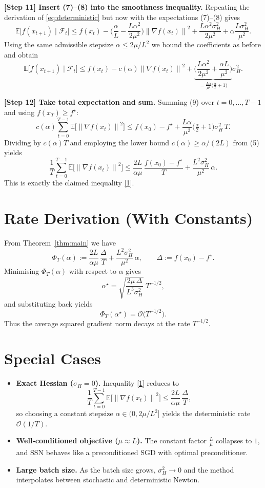 \documentclass{article}
\newcommand{\E}{\mathbb{E}}
\newcommand{\norm}[1]{\left\|#1\right\|}
\begin{document}
\noindent\textbf{[Step 11] Insert (7)–(8) into the smoothness inequality.}
Repeating the derivation of \eqref{eq:deterministic} but now with the
expectations (7)–(8) gives
\[
\E\!\big[f(x_{t+1})\mid\mathcal{F}_t\big]
\le f(x_t)-\Big(\frac{\alpha}{L}
               -\frac{L\alpha^2}{2\mu^2}\Big)\norm{\nabla f(x_t)}^2
      +\frac{L\alpha^2\sigma_H^2}{2\mu^2}
      +\alpha\frac{L\sigma_H^2}{\mu^2}.
\]
Using the same admissible stepsize $\alpha\le 2\mu/L^2$ we bound the
coefficients as before and obtain
\[
\E\!\big[f(x_{t+1})\mid\mathcal{F}_t\big]
\le f(x_t)-c(\alpha)\norm{\nabla f(x_t)}^2
      +\underbrace{\Big(\frac{L\alpha^2}{2\mu^2}
                     +\frac{\alpha L}{\mu^2}\Big)}_{\displaystyle
                     =\frac{L\alpha}{\mu^2}\big(\tfrac{\alpha}{2}+1\big)}
        \sigma_H^2 .
\tag{9}
\]

\noindent\textbf{[Step 12] Take total expectation and sum.}
Summing (9) over $t=0,\dots,T-1$ and using $f(x_T)\ge f^\star$:
\[
c(\alpha)\sum_{t=0}^{T-1}\E\!\big[\norm{\nabla f(x_t)}^2\big]
\le f(x_0)-f^\star
   +\frac{L\alpha}{\mu^2}\big(\tfrac{\alpha}{2}+1\big)\sigma_H^2\,T .
\]
Dividing by $c(\alpha)T$ and employing the lower bound $c(\alpha)\ge\alpha/(2L)$
from (5) yields
\[
\frac{1}{T}\sum_{t=0}^{T-1}\E\!\big[\norm{\nabla f(x_t)}^2\big]
\le \frac{2L}{\alpha\mu}\,\frac{f(x_0)-f^\star}{T}
   +\frac{L^2\sigma_H^2}{\mu^2}\,\alpha .
\]
This is exactly the claimed inequality \eqref{1}. \qedhere

\section*{Rate Derivation (With Constants)}
From Theorem~\ref{thm:main} we have
\[
\Phi_T(\alpha):=
\frac{2L}{\alpha\mu}\,\frac{\Delta}{T}
   +\frac{L^2\sigma_H^2}{\mu^2}\,\alpha,
\qquad \Delta:=f(x_0)-f^\star .
\]
Minimising $\Phi_T(\alpha)$ with respect to $\alpha$ gives
\[
\alpha^\star = \sqrt{\frac{2\mu\,\Delta}{L^3\sigma_H^2}}\; T^{-1/2},
\]
and substituting back yields
\[
\Phi_T(\alpha^\star)=
\mathcal{O}\!\big(T^{-1/2}\big) .
\]
Thus the average squared gradient norm decays at the rate $T^{-1/2}$.

\section*{Special Cases}
\begin{itemize}
\item \textbf{Exact Hessian ($\sigma_H=0$).} Inequality \eqref{1} reduces to
\[
\frac{1}{T}\sum_{t=0}^{T-1}\E\!\big[\norm{\nabla f(x_t)}^2\big]
\le \frac{2L}{\alpha\mu}\,\frac{\Delta}{T},
\]
so choosing a constant stepsize $\alpha\in(0,2\mu/L^2]$ yields the deterministic
rate $\mathcal{O}(1/T)$.
\item \textbf{Well‑conditioned objective ($\mu\approx L$).} The constant factor
$\frac{L}{\mu}$ collapses to $1$, and SSN behaves like a preconditioned SGD
with optimal preconditioner.
\item \textbf{Large batch size.} As the batch size grows, $\sigma_H^2\to0$ and the
method interpolates between stochastic and deterministic Newton.
\end{itemize}
\end{document}
